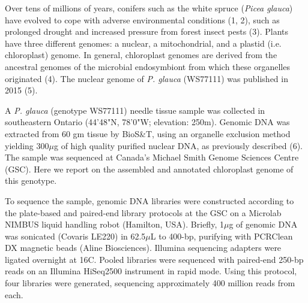 \documentclass[titlepage,11pt, oneside]{article}   	%
\begin{document}
Over tens of millions of years, conifers such as the white spruce (\textit{Picea glauca}) have evolved to cope with adverse environmental conditions (1, 2), such as prolonged drought and increased pressure from forest insect pests (3). Plants have three different genomes: a nuclear, a mitochondrial, and a plastid (i.e. chloroplast) genome. In general, chloroplast genomes are derived from the ancestral genomes of the microbial endosymbiont from which these organelles originated (4). The nuclear genome of \textit{P. glauca} (WS77111) was published in 2015 (5).
\newline
\par
A \textit{P. glauca} (genotype WS77111) needle tissue sample was collected in southeastern Ontario (44'48"N, 78'0"W; elevation: 250m). Genomic DNA was extracted from 60 gm tissue by BioS\&T, using an organelle exclusion method yielding 300$\mu$g of high quality purified nuclear DNA, as previously described (6). The sample was sequenced at Canada’s Michael Smith Genome Sciences Centre (GSC). Here we report on the assembled and annotated chloroplast genome of this genotype.
\newline
\par
To sequence the sample, genomic DNA libraries were constructed according to the plate-based and paired-end library protocols at the GSC on a Microlab NIMBUS liquid handling robot (Hamilton, USA). Briefly, 1$\mu$g of genomic DNA was sonicated (Covaris LE220) in 62.5$\mu$L to 400-bp, purifying with PCRClean DX magnetic beads (Aline Biosciences). Illumina sequencing adapters were ligated overnight at 16\degree C. Pooled libraries were sequenced with paired-end 250-bp reads on an Illumina HiSeq2500 instrument in rapid mode. Using this protocol, four libraries were generated, sequencing approximately 400 million reads from each.
\newline
\par
\end{document}
